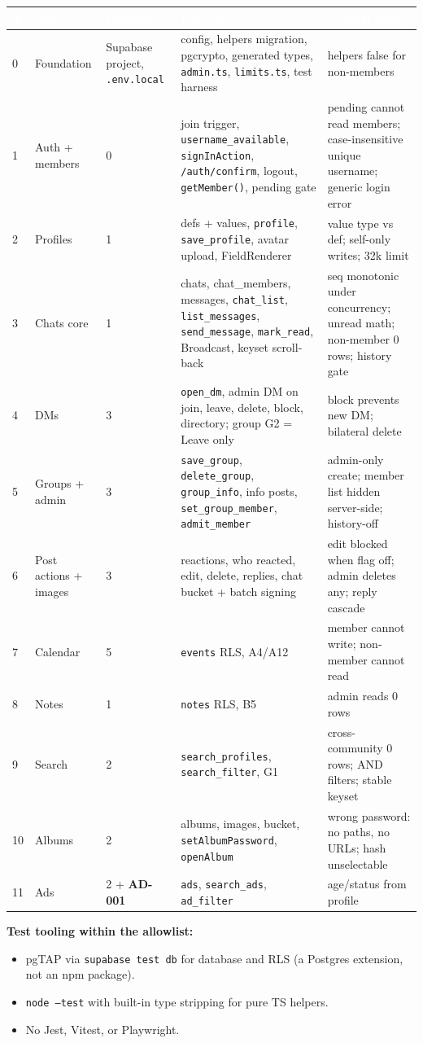 \documentclass[11pt,a4paper]{article}
\newcommand{\hdr}[1]{\textcolor{white}{\textbf{#1}}}
\newcommand{\code}[1]{\texttt{\small #1}}
\begin{document}
{\small
{}
\begin{longtable}{L{0.5cm} L{2.4cm} L{1.8cm} L{5.6cm} L{4.6cm}}
\hdr{\#} & \hdr{Slice} & \hdr{Depends} & \hdr{Delivers} & \hdr{Critical tests}\\
 & Foundation & Supabase project, \code{.env.local} & config, helpers migration, pgcrypto, generated types, \code{admin.ts}, \code{limits.ts}, test harness & helpers false for non-members\\
1 & Auth + members & 0 & join trigger, \code{username\_available}, \code{signInAction}, \code{/auth/confirm}, logout, \code{getMember()}, pending gate & pending cannot read members; case-insensitive unique username; generic login error\\
2 & Profiles & 1 & defs + values, \code{profile}, \code{save\_profile}, avatar upload, FieldRenderer & value type vs def; self-only writes; 32k limit\\
3 & Chats core & 1 & chats, chat\_members, messages, \code{chat\_list}, \code{list\_messages}, \code{send\_message}, \code{mark\_read}, Broadcast, keyset scroll-back & seq monotonic under concurrency; unread math; non-member 0 rows; history gate\\
4 & DMs & 3 & \code{open\_dm}, admin DM on join, leave, delete, block, directory; group G2 = Leave only & block prevents new DM; bilateral delete\\
5 & Groups + admin & 3 & \code{save\_group}, \code{delete\_group}, \code{group\_info}, info posts, \code{set\_group\_member}, \code{admit\_member} & admin-only create; member list hidden server-side; history-off\\
6 & Post actions + images & 3 & reactions, who reacted, edit, delete, replies, chat bucket + batch signing & edit blocked when flag off; admin deletes any; reply cascade\\
7 & Calendar & 5 & \code{events} RLS, A4/A12 & member cannot write; non-member cannot read\\
8 & Notes & 1 & \code{notes} RLS, B5 & admin reads 0 rows\\
9 & Search & 2 & \code{search\_profiles}, \code{search\_filter}, G1 & cross-community 0 rows; AND filters; stable keyset\\
10 & Albums & 2 & albums, images, bucket, \code{setAlbumPassword}, \code{openAlbum} & wrong password: no paths, no URLs; hash unselectable\\
11 & Ads & 2 + \textbf{AD-001} & \code{ads}, \code{search\_ads}, \code{ad\_filter} & age/status from profile\\
\end{longtable}
}
\textbf{Test tooling within the allowlist:}
\begin{itemize}
  \item pgTAP via \code{supabase test db} for database and RLS (a Postgres extension, not an npm package).
  \item \code{node --test} with built-in type stripping for pure TS helpers.
  \item No Jest, Vitest, or Playwright.
\end{itemize}
\end{document}
